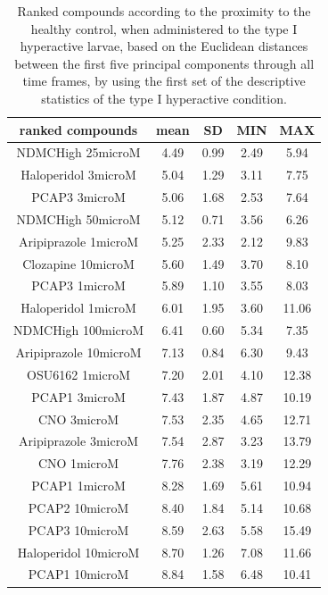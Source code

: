 \documentclass[a4paper,12pt]{article}
\begin{document}
\begin{table}[h!]\tiny
\centering
\caption{Ranked compounds according to the proximity to the healthy control, when administered to the type I hyperactive larvae, based on the Euclidean distances between the first five principal components through all time frames, by using the first set of the descriptive statistics of the type I hyperactive condition.}
\begin{tabular}{|c|c|c|c|c|}
\hline
ranked compounds             & mean & SD   & MIN  & MAX   \\ \hline
NDMCHigh 25microM     & 4.49  & 0.99  & 2.49 & 5.94  \\ \hline
Haloperidol 3microM   & 5.04  & 1.29  & 3.11 & 7.75  \\ \hline
PCAP3 3microM       & 5.06  & 1.68  & 2.53 & 7.64  \\ \hline
NDMCHigh 50microM     & 5.12  & 0.71  & 3.56 & 6.26  \\ \hline
Aripiprazole 1microM  & 5.25  & 2.33  & 2.12 & 9.83  \\ \hline
Clozapine 10microM    & 5.60   & 1.49  & 3.70  & 8.10   \\ \hline
PCAP3 1microM       & 5.89  & 1.10   & 3.55 & 8.03  \\ \hline
Haloperidol 1microM   & 6.01  & 1.95  & 3.60  & 11.06 \\ \hline
NDMCHigh 100microM    & 6.41  & 0.60   & 5.34 & 7.35  \\ \hline
Aripiprazole 10microM & 7.13  & 0.84  & 6.30  & 9.43  \\ \hline
OSU6162 1microM       & 7.20   & 2.01  & 4.10  & 12.38 \\ \hline
PCAP1 3microM         & 7.43  & 1.87  & 4.87 & 10.19 \\ \hline
CNO 3microM           & 7.53  & 2.35  & 4.65 & 12.71 \\ \hline
Aripiprazole 3microM  & 7.54  & 2.87  & 3.23 & 13.79 \\ \hline
CNO 1microM           & 7.76  & 2.38  & 3.19 & 12.29 \\ \hline
PCAP1 1microM         & 8.28  & 1.69  & 5.61 & 10.94 \\ \hline
PCAP2 10microM        & 8.40   & 1.84  & 5.14 & 10.68 \\ \hline
PCAP3 10microM      & 8.59  & 2.63  & 5.58 & 15.49 \\ \hline
Haloperidol 10microM  & 8.70   & 1.26  & 7.08 & 11.66 \\ \hline
PCAP1 10microM        & 8.84  & 1.58  & 6.48 & 10.41 \\ \hline

\end{tabular}
\end{table}
\end{document}

